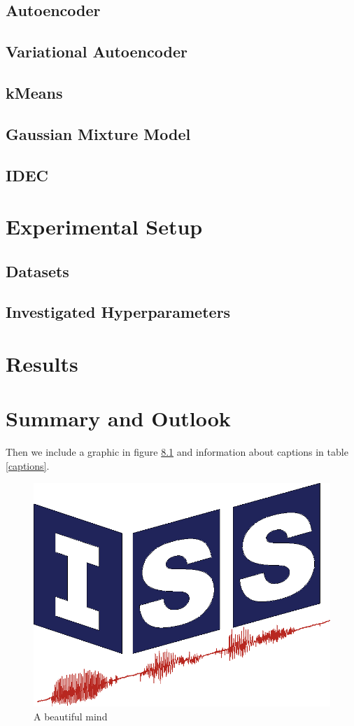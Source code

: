 \documentclass[12pt,DIV14,BCOR12mm,a4paper,footexclude,headinclude,halfparskip-,twoside,openright,openany,cleardoubleempty,idxtotoc,bibtotoc]{scrreprt} %
\numberwithin{equation}{chapter}
\begin{document}
\section{Autoencoder}
\section{Variational Autoencoder}
\section{kMeans}
\section{Gaussian Mixture Model}
\section{IDEC}
\chapter{Experimental Setup}
\section{Datasets}
\section{Investigated Hyperparameters}
\chapter{Results}
\chapter{Summary and Outlook}

Then we include a graphic in figure \ref{mind} and information about captions in table \ref{captions}.\\
\begin{figure}
	\centering
	\includegraphics[scale=.3]{isslogocolor}
	\caption{A beautiful mind}
	\label{mind}
\end{figure}
\end{document}
